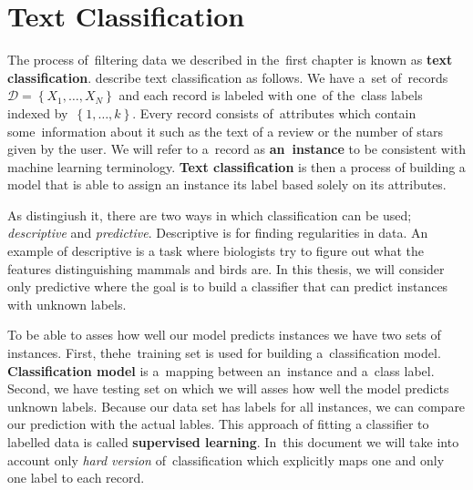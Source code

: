 \chapter{Text Classification}


The process of~filtering data we described in the~first chapter is known as {\bf text classification}.
\citet{AggZhai12} describe text classification as follows.
We have a~set of~records~$\mathcal{D} = \left\{X_1, \ldots, X_N\right\}$ and each record is labeled with one~of the~class labels indexed by~$\left\{1,\ldots, k\right\}$.
Every record consists of~attributes which contain some~information about it such as the text of a review or the number of stars given by the user.
We will refer to a~record as {\bf an~instance} to be consistent with machine learning terminology.
{\bf Text classification} is then a process of building a model that is able to assign
an instance its label based solely on its attributes.

As \citet{TanBachKum08} distingiush it, there are two ways in which classification can be used; {\it descriptive} and {\it predictive}.
Descriptive is for finding regularities in data.
An example of descriptive is a task where
biologists try to figure out what the features distinguishing mammals and birds are.
In this thesis, we will consider only predictive where the goal is to build a classifier
that can predict instances with unknown labels.

To be able to asses how well our model predicts instances we have two sets of instances.
First, thehe~training set is  used for building a~classification model.
{\bf Classification model} is a~mapping between an~instance and a~class label.
Second, we have testing set on which we will asses how well the model predicts unknown labels.
Because our data set has labels for all instances, we can compare our prediction with the actual lables.
This approach of fitting a classifier to labelled data is called {\bf supervised learning}.
In~this document we will take into account only \emph{hard version} of~classification which explicitly maps one and only one label to each record.  



